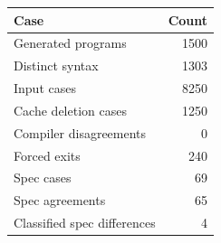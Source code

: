 \begin{tabular}{lr}
\toprule Case & Count \\
\midrule
Generated programs & 1500 \\
Distinct syntax & 1303 \\
Input cases & 8250 \\
Cache deletion cases & 1250 \\
Compiler disagreements & 0 \\
Forced exits & 240 \\
Spec cases & 69 \\
Spec agreements & 65 \\
Classified spec differences & 4 \\
\bottomrule
\end{tabular}
